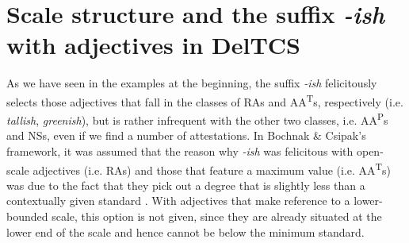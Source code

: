 \documentclass[output=paper]{langsci/langscibook}
\begin{document}
\section{Scale structure and the suffix \textit{-ish} with adjectives in DelTCS}
\label{scale-ish-deltcs}

As we have seen in the examples at the beginning, the suffix \textit{-ish} felicitously selects those adjectives that fall in the classes of RAs and AA\textsuperscript{T}s, respectively (i.e. \textit{tallish}, \textit{greenish}), but is rather infrequent with the other two classes, i.e. AA\textsuperscript{P}s and NSs, even if we find a number of attestations.
In Bochnak \& Csipak's \citeyearpar{Bochnak2014} framework, it was assumed that the reason why \textit{-ish} was felicitous with open-scale adjectives (i.e. RAs) and those that feature a maximum value (i.e. AA\textsuperscript{T}s) was due to the fact that they pick out a degree that is slightly less than a contextually given standard \citeyearpar[436]{Bochnak2014}. With adjectives that make reference to a lower-bounded scale, this option is not given, since they are already situated at the lower end of the scale and hence cannot be below the minimum standard.
\end{document}

